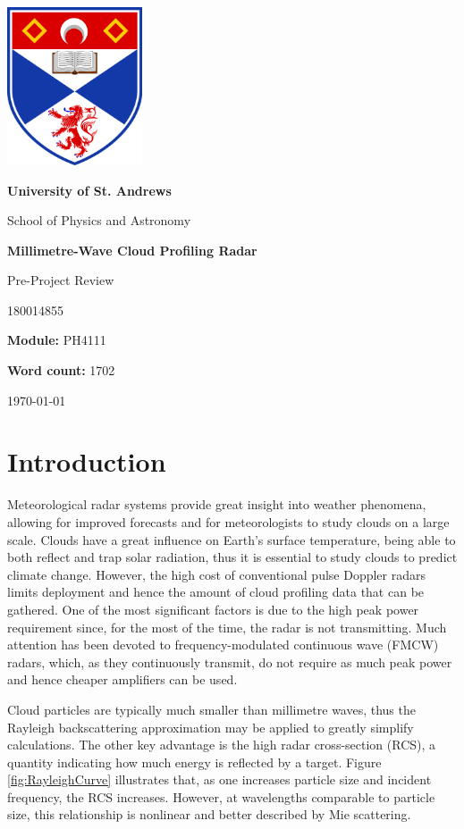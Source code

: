 \documentclass{article}
\title {\mytitle}
\author{\myauthor}
\date  {\mydate}
\newcommand\mytitle    {Millimetre-Wave Cloud Profiling Radar}
\newcommand\mysubtitle {Pre-Project Review}
\newcommand\myauthor   {180014855}
\newcommand\mymodule   {PH4111}
\newcommand\mywordcount{1702}
\begin{document}
\begin{titlepage}
	\centering
	{\includegraphics[width=0.3\textwidth]{uos-logo}}
	\par
	{\LARGE\bfseries University of St. Andrews\par}
	{\LARGE School of Physics and Astronomy\par}
	\vspace{1.5cm}
	{\huge\bfseries\mytitle\par}
	{\Large\mysubtitle\par}
	\vspace{2cm}
	{\Large\myauthor\par}
	{\large\textbf{Module:} \mymodule\par}
	{\large\textbf{Word count:} \mywordcount\par}
	\vfill
	{\large\today\par}
\end{titlepage}

\section{Introduction}
Meteorological radar systems provide great insight into weather phenomena, allowing for improved forecasts and for meteorologists to study clouds on a large scale. Clouds have a great influence on Earth's surface temperature, being able to both reflect and trap solar radiation, thus it is essential to study clouds to predict climate change. However, the high cost of conventional pulse Doppler radars limits deployment and hence the amount of cloud profiling data that can be gathered. One of the most significant factors is due to the high peak power requirement since, for the most of the time, the radar is not transmitting.
Much attention has been devoted to frequency-modulated continuous wave (FMCW) radars, which, as they continuously transmit, do not require as much peak power and hence cheaper amplifiers can be used.

Cloud particles are typically much smaller than millimetre waves, thus the Rayleigh backscattering approximation may be applied to greatly simplify calculations. The other key advantage is the high radar cross-section (RCS), a quantity indicating how much energy is reflected by a target. Figure \ref{fig:RayleighCurve} illustrates that, as one increases particle size and incident frequency, the RCS increases. However, at wavelengths comparable to particle size, this relationship is nonlinear and better described by Mie scattering.
\end{document}
